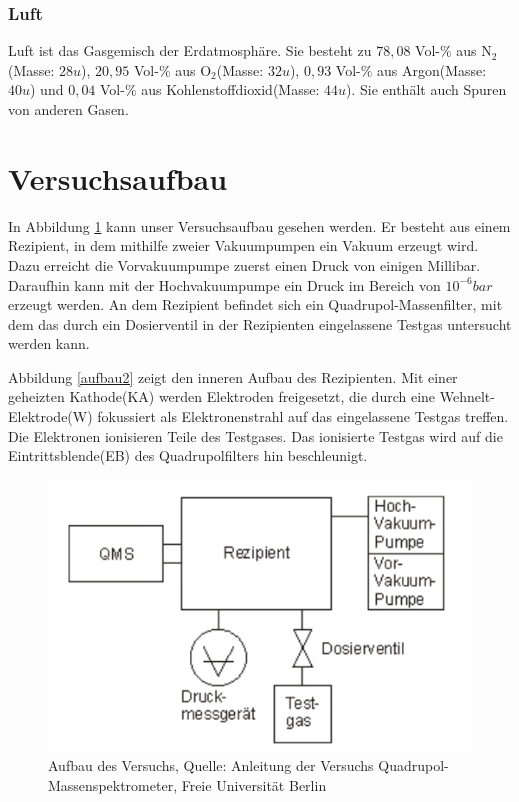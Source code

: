 \documentclass[10pt,a4paper]{article}
\begin{document}
\subsubsection{Luft}

Luft ist das Gasgemisch der Erdatmosphäre. Sie besteht zu $78,08$ Vol-$\%$ aus N$_2$(Masse: $28 u$), $20,95$ Vol-$\%$ aus O$_2$(Masse: $32u$), $0,93$ Vol-$\%$ aus Argon(Masse: $40u$) und $0,04$ Vol-$\%$ aus Kohlenstoffdioxid(Masse: $44u$). Sie enthält auch Spuren von anderen Gasen.



\section{Versuchsaufbau}

In Abbildung \ref{aufbau1} kann unser Versuchsaufbau gesehen werden. Er besteht aus einem Rezipient, in dem mithilfe zweier Vakuumpumpen ein Vakuum erzeugt wird. Dazu erreicht die Vorvakuumpumpe zuerst einen Druck von einigen Millibar. Daraufhin kann mit der Hochvakuumpumpe ein Druck im Bereich von $10^{-6} bar$ erzeugt werden. An dem Rezipient befindet sich ein Quadrupol-Massenfilter, mit dem das durch ein Dosierventil in der Rezipienten eingelassene Testgas untersucht werden kann.

Abbildung \ref{aufbau2} zeigt den inneren Aufbau des Rezipienten. Mit einer geheizten Kathode(KA) werden Elektroden freigesetzt, die durch eine Wehnelt-Elektrode(W) fokussiert als Elektronenstrahl auf das eingelassene Testgas treffen. Die Elektronen ionisieren Teile des Testgases. Das ionisierte Testgas wird auf die Eintrittsblende(EB) des Quadrupolfilters hin beschleunigt. 

\begin{figure}[h]
	\centering
	\includegraphics[scale = 0.8]{aufbau.png}
	\caption{Aufbau des Versuchs, Quelle: Anleitung der Versuchs Quadrupol-Massenspektrometer, Freie Universität Berlin}
	\label{aufbau1}
\end{figure}
\end{document}
